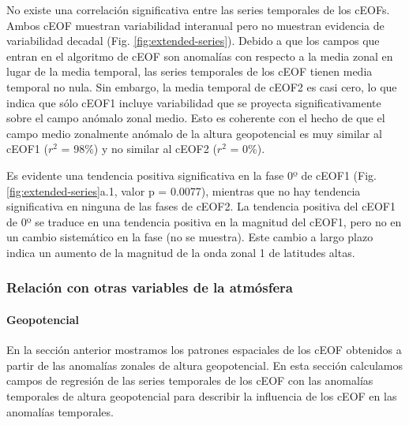 \documentclass[12pt,oneside]{reedthesis}
\begin{document}
No existe una correlación significativa entre las series temporales de los cEOFs.
Ambos cEOF muestran variabilidad interanual pero no muestran evidencia de variabilidad decadal (Fig. \ref{fig:extended-series}).
Debido a que los campos que entran en el algoritmo de cEOF son anomalías con respecto a la media zonal en lugar de la media temporal, las series temporales de los cEOF tienen media temporal no nula.
Sin embargo, la media temporal de cEOF2 es casi cero, lo que indica que sólo cEOF1 incluye variabilidad que se proyecta significativamente sobre el campo anómalo zonal medio.
Esto es coherente con el hecho de que el campo medio zonalmente anómalo de la altura geopotencial es muy similar al cEOF1 (\(r^2\) = 98\%) y no similar al cEOF2 (\(r^2\) = 0\%).

Es evidente una tendencia positiva significativa en la fase 0º de cEOF1 (Fig. \ref{fig:extended-series}a.1, valor p = 0.0077), mientras que no hay tendencia significativa en ninguna de las fases de cEOF2.
La tendencia positiva del cEOF1 de 0º se traduce en una tendencia positiva en la magnitud del cEOF1, pero no en un cambio sistemático en la fase (no se muestra).
Este cambio a largo plazo indica un aumento de la magnitud de la onda zonal 1 de latitudes altas.

\hypertarget{relaciuxf3n-con-otras-variables-de-la-atmuxf3sfera}{%
\subsubsection{Relación con otras variables de la atmósfera}\label{relaciuxf3n-con-otras-variables-de-la-atmuxf3sfera}}

\hypertarget{geopotencial}{%
\paragraph{Geopotencial}\label{geopotencial}}

En la sección anterior mostramos los patrones espaciales de los cEOF obtenidos a partir de las anomalías zonales de altura geopotencial.
En esta sección calculamos campos de regresión de las series temporales de los cEOF con las anomalías temporales de altura geopotencial para describir la influencia de los cEOF en las anomalías temporales.
\end{document}
